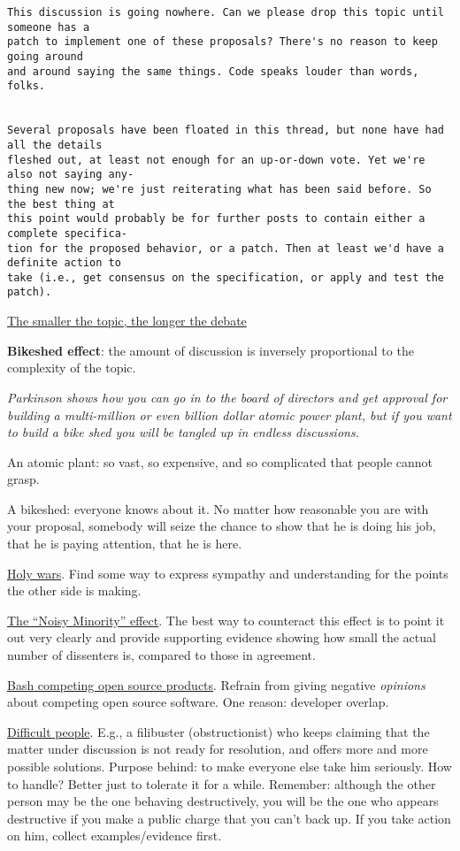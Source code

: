 \documentclass[landscape,30pt]{foils}
\begin{document}
{\small
\begin{verbatim}
This discussion is going nowhere. Can we please drop this topic until someone has a
patch to implement one of these proposals? There's no reason to keep going around
and around saying the same things. Code speaks louder than words, folks.


Several proposals have been floated in this thread, but none have had all the details
fleshed out, at least not enough for an up-or-down vote. Yet we're also not saying any-
thing new now; we're just reiterating what has been said before. So the best thing at
this point would probably be for further posts to contain either a complete specifica-
tion for the proposed behavior, or a patch. Then at least we'd have a definite action to
take (i.e., get consensus on the specification, or apply and test the patch).
\end{verbatim}
}

\underline{The smaller the topic, the longer the debate}

{\bf Bikeshed effect}: the amount of discussion is inversely proportional to the complexity of the topic.

{\em Parkinson shows how you can go in to the board of directors and get approval for building a multi-million or even billion dollar atomic power plant, but if you want to build a bike shed you will be tangled up in endless discussions.}

An atomic plant: so vast, so expensive, and so complicated that people cannot grasp.

A bikeshed: everyone knows about it.  No matter how reasonable you are with your proposal, somebody will seize the chance to show
that he is doing his job, that he is paying attention, that he is here.

\underline{Holy wars}.   Find some way to express sympathy and understanding for the points the other side is making.

\underline{The ``Noisy Minority'' effect}.  The best way to counteract this effect is to point it out very clearly and provide supporting evidence showing how small the actual number of dissenters is, compared to those in agreement.

\underline{Bash competing open source products}. Refrain from giving negative {\em opinions} about competing open source software. One reason: developer overlap.

\underline{Difficult people}.  E.g., a filibuster (obstructionist) who keeps claiming that the matter under discussion is not ready for resolution, and offers more and more possible solutions. Purpose behind: to make everyone else take him seriously.  How to handle? Better just to tolerate it for a while.  Remember: although the other person may be the one behaving destructively, you will be the one who appears destructive if you make a public charge that you can't back up.  If you take action on him, collect examples/evidence first.
\end{document}
